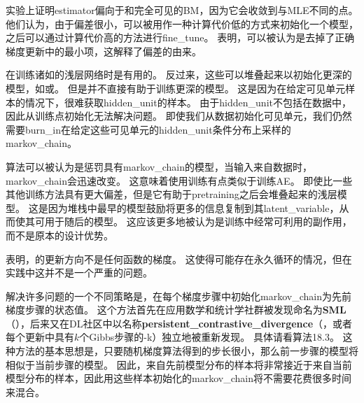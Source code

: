 \cite{Perpinan+Hinton-2005-small}实验上证明\gls{estimator}偏向于和完全可见的\gls{BM}，因为它会收敛到与\gls{MLE}不同的点。
他们认为，由于偏差很小，可以被用作一种计算代价低的方式来初始化一个模型，之后可以通过计算代价高的方法进行\gls{fine_tune}。
\cite{Bengio+Delalleau-2009}表明，可以被认为是去掉了正确梯度更新中的最小项，这解释了偏差的由来。


在训练诸如的浅层网络时是有用的。
反过来，这些可以堆叠起来以初始化更深的模型，如或。
但是并不直接有助于训练更深的模型。
这是因为在给定可见单元样本的情况下，很难获取\gls{hidden_unit}的样本。
由于\gls{hidden_unit}不包括在数据中，因此从训练点初始化无法解决问题。
即使我们从数据初始化可见单元，我们仍然需要\gls{burn_in}在给定这些可见单元的\gls{hidden_unit}条件分布上采样的\gls{markov_chain}。


算法可以被认为是惩罚具有\gls{markov_chain}的模型，当输入来自数据时，\gls{markov_chain}会迅速改变。
这意味着使用训练有点类似于训练\gls{AE}。
即使比一些其他训练方法具有更大偏差，但是它有助于\gls{pretraining}之后会堆叠起来的浅层模型。
这是因为堆栈中最早的模型鼓励将更多的信息复制到其\gls{latent_variable}，从而使其可用于随后的模型。
这应该更多地被认为是训练中经常可利用的副作用，而不是原本的设计优势。


\cite{sutskever2010convergence-small}表明，的更新方向不是任何函数的梯度。
这使得可能存在永久循环的情况，但在实践中这并不是一个严重的问题。


解决许多问题的一个不同策略是，在每个梯度步骤中初始化\gls{markov_chain}为先前梯度步骤的状态值。
这个方法首先在应用数学和统计学社群被发现命名为\textbf{\gls{SML}}（）\citep{Younes98onthe}，后来又在\gls{DL}社区中以名称\textbf{\gls{persistent_contrastive_divergence}}（，或者每个更新中具有$k$个Gibbs步骤的-k）独立地被重新发现\citep{Tieleman08-small}。
具体请看算法18.3。
这种方法的基本思想是，只要随机梯度算法得到的步长很小，那么前一步骤的模型将相似于当前步骤的模型。
因此，来自先前模型分布的样本将非常接近于来自当前模型分布的样本，因此用这些样本初始化的\gls{markov_chain}将不需要花费很多时间来混合。


